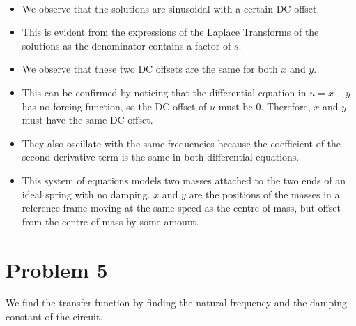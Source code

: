 \documentclass[11pt]{article}
\providecommand{\tightlist}{%
      \setlength{\itemsep}{0pt}\setlength{\parskip}{0pt}}
\begin{document}
	

	

    \begin{center}
    \end{center}
    { \hspace*{\fill} \\}
    
	
		
    \begin{itemize}
\tightlist
\item
  We observe that the solutions are sinusoidal with a certain DC offset.
\item
  This is evident from the expressions of the Laplace Transforms of the
  solutions as the denominator contains a factor of \(s\).
\item
  We observe that these two DC offsets are the same for both \(x\) and
  \(y\).
\item
  This can be confirmed by noticing that the differential equation in
  \(u = x-y\) has no forcing function, so the DC offset of \(u\) must be
  \(0\). Therefore, \(x\) and \(y\) must have the same DC offset.
\item
  They also oscillate with the same frequencies because the coefficient
  of the second derivative term is the same in both differential
  equations.
\item
  This system of equations models two masses attached to the two ends of
  an ideal spring with no damping. \(x\) and \(y\) are the positions of
  the masses in a reference frame moving at the same speed as the centre
  of mass, but offset from the centre of mass by some amount.
\end{itemize}

	

	
		
    \section{Problem 5}\label{problem-5}

We find the transfer function by finding the natural frequency and the
damping constant of the circuit.

	

	
		
	
	
		
	
		
			
		
	
\end{document}
